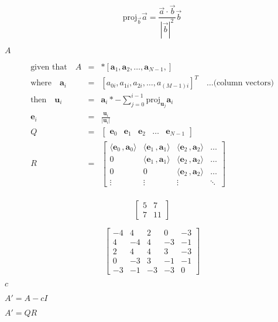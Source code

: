 \documentclass{article}
\begin{document}
\[\text{proj}_\vec{b}\vec{a}=\frac{\vec{a}\cdot\vec{b}}{\left|\vec{b}\right|^2}\vec{b}\]
\pagebreak

$A$
\pagebreak

\begin{eqnarray*}
  \text{given that}\quad A &=&
*\left[\mathbf{a}_1,\mathbf{a}_2,\ldots,\mathbf{a}_{N-1},\right]\\
  \text{where}\quad\mathbf{a}_i &=&
  \left[a_{0i},a_{1i},a_{2i},\ldots,a_{(M-1)i}\right]^T\quad\ldots\mbox{(column
  vectors)}\\
  \text{then}\quad\mathbf{u}_i &=& \mathbf{a}_i
*-\sum_{j=0}^{i-1}\text{proj}_{\mathbf{u}_j}\mathbf{a}_i\\
  \mathbf{e}_i &=&\frac{\mathbf{u}_i}{\left|\mathbf{u}_i\right|}\\
  Q &=& \begin{bmatrix}\mathbf{e}_0 & \mathbf{e}_1 & \mathbf{e}_2 & \dots &
  \mathbf{e}_{N-1}\end{bmatrix}\\
  R &=& \begin{bmatrix}\langle\mathbf{e}_0\,,\mathbf{a}_0\rangle &
  \langle\mathbf{e}_1\,,\mathbf{a}_1\rangle &
  \langle\mathbf{e}_2\,,\mathbf{a}_2\rangle & \dots \\
                   0 & \langle\mathbf{e}_1\,,\mathbf{a}_1\rangle &
  \langle\mathbf{e}_2\,,\mathbf{a}_2\rangle & \dots\\
                   0 & 0 & \langle\mathbf{e}_2\,,\mathbf{a}_2\rangle &
  \dots\\ \vdots & \vdots & \vdots & \ddots
       \end{bmatrix}\\
  \end{eqnarray*}
\pagebreak

\[\begin{bmatrix}
5 & 7\\
7 & 11
\end{bmatrix}\]
\pagebreak

\[\begin{bmatrix}
-4& 4& 2& 0& -3\\
4& -4& 4& -3& -1\\
2& 4& 4& 3& -3\\
0& -3& 3& -1&-1\\
-3& -1& -3& -3& 0
\end{bmatrix}\]
\pagebreak

$c$
\pagebreak

$A' = A - cI$
\pagebreak

$A'=QR$
\pagebreak
\end{document}
